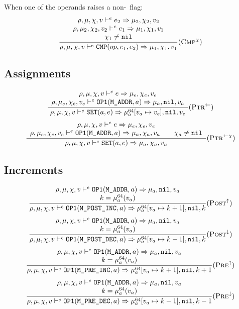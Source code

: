When one of the operands raises a non-\nil\ flag:
\[\dfrac{\begin{array}{c}
    \rho,\mu,\chi,v \vdash^e e_2\Rightarrow \mu_2,\chi_2,v_2 \\
    \rho,\mu_2,\chi_2,v_2 \vdash^e e_1\Rightarrow \mu_1,\chi_1,v_1 \\
    \chi_1\ne\texttt{nil}
\end{array}}{\rho,\mu,\chi,v \vdash^e \texttt{CMP}(op, e_1, e_2) \Rightarrow \mu_1,\chi_1,v_1} (\textsc{Cmp}^\chi)\]

\subsection{Assignments}

\[\dfrac{\begin{array}{c}
    \rho,\mu,\chi,v \vdash^e e \Rightarrow \mu_e,\chi_e,v_e \\
    \rho,\mu_e,\chi_e,v_e \vdash^e \texttt{OP1}(\texttt{M\_ADDR}, a) \Rightarrow \mu_a,\texttt{nil},v_a
\end{array}}{\rho,\mu,\chi,v \vdash^e \texttt{SET}(a, e) \Rightarrow \mu_a^{64}[v_a\mapsto v_e],\texttt{nil},v_e}(\textsc{Ptr}^\gets)\]
\[\dfrac{\begin{array}{c}
    \rho,\mu,\chi,v \vdash^e e \Rightarrow \mu_e,\chi_e,v_e \\
    \rho,\mu_e,\chi_e,v_e \vdash^e \texttt{OP1}(\texttt{M\_ADDR}, a) \Rightarrow \mu_a,\chi_a,v_a \qquad \chi_a\ne\texttt{nil}
\end{array}}{\rho,\mu,\chi,v \vdash^e \texttt{SET}(a, e) \Rightarrow \mu_a,\chi_a,v_a}(\textsc{Ptr}^{\gets\chi})\]

\subsection{Increments}
\[\dfrac{\begin{array}{c}
    \rho,\mu,\chi,v \vdash^e \texttt{OP1}(\texttt{M\_ADDR}, a)\Rightarrow \mu_a,\texttt{nil},v_a \\
    k = \mu_a^{64}(v_a)
\end{array}}{\rho,\mu,\chi,v \vdash^e \texttt{OP1}(\texttt{M\_POST\_INC}, a) \Rightarrow \mu_a^{64}[v_a\mapsto k+1],\texttt{nil},k} (\textsc{Post}^\uparrow)\]
\[\dfrac{\begin{array}{c}
    \rho,\mu,\chi,v \vdash^e \texttt{OP1}(\texttt{M\_ADDR}, a)\Rightarrow \mu_a,\texttt{nil},v_a \\
    k = \mu_a^{64}(v_a)
\end{array}}{\rho,\mu,\chi,v \vdash^e \texttt{OP1}(\texttt{M\_POST\_DEC}, a) \Rightarrow \mu_a^{64}[v_a\mapsto k-1],\texttt{nil},k} (\textsc{Post}^\downarrow)\]
\[\dfrac{\begin{array}{c}
    \rho,\mu,\chi,v \vdash^e \texttt{OP1}(\texttt{M\_ADDR}, a)\Rightarrow \mu_a,\texttt{nil},v_a \\
    k = \mu_a^{64}(v_a)
\end{array}}{\rho,\mu,\chi,v \vdash^e \texttt{OP1}(\texttt{M\_PRE\_INC}, a) \Rightarrow \mu_a^{64}[v_a\mapsto k+1],\texttt{nil},k+1} (\textsc{Pre}^\uparrow)\]
\[\dfrac{\begin{array}{c}
    \rho,\mu,\chi,v \vdash^e \texttt{OP1}(\texttt{M\_ADDR}, a)\Rightarrow \mu_a,\texttt{nil},v_a \\
    k = \mu_a^{64}(v_a)
\end{array}}{\rho,\mu,\chi,v \vdash^e \texttt{OP1}(\texttt{M\_PRE\_DEC}, a) \Rightarrow \mu_a^{64}[v_a\mapsto k-1],\texttt{nil},k-1} (\textsc{Pre}^\downarrow)\]



